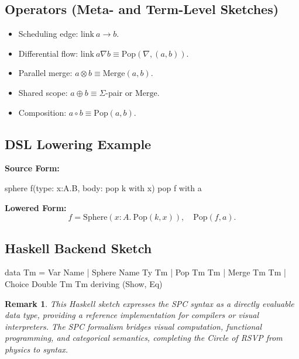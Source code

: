 \documentclass[12pt]{article}
\newtheorem{remark}{Remark}
\begin{document}
\subsection*{Operators (Meta- and Term-Level Sketches)}
\begin{itemize}[leftmargin=1.2em]
  \item Scheduling edge: \(\mathrm{link}\ a \to b\).
  \item Differential flow: \(\mathrm{link}\ a \nabla b \equiv \mathrm{Pop}(\nabla,(a,b))\).
  \item Parallel merge: \(a \otimes b \equiv \mathrm{Merge}(a,b)\).
  \item Shared scope: \(a \oplus b \equiv \Sigma\)-pair or \(\mathrm{Merge}\).
  \item Composition: \(a \circ b \equiv \mathrm{Pop}(a,b)\).
\end{itemize}

\subsection*{DSL Lowering Example}

\textbf{Source Form:}
\begin{codeblock}
sphere f(type: x:A.B, body: pop k with x)
pop f with a
\end{codeblock}

\textbf{Lowered Form:}
\[
f = \mathrm{Sphere}(x{:}A.\ \mathrm{Pop}(k,x)), \quad \mathrm{Pop}(f,a).
\]

\subsection*{Haskell Backend Sketch}
\begin{codeblock}
data Tm
  = Var Name
  | Sphere Name Ty Tm
  | Pop Tm Tm
  | Merge Tm Tm
  | Choice Double Tm Tm
  deriving (Show, Eq)
\end{codeblock}

\begin{remark}
This Haskell sketch expresses the SPC syntax as a directly evaluable data type, providing a reference implementation for compilers or visual interpreters. The SPC formalism bridges visual computation, functional programming, and categorical semantics, completing the Circle of RSVP from physics to syntax.
\end{remark}
\end{document}
